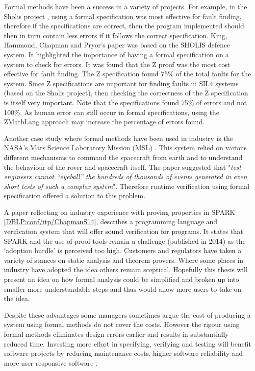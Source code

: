 Formal methods have been a success in a variety of projects. For example, in the Sholis project \cite{sholis}, using a formal specification was most effective for fault finding, therefore if the specifications are correct, then the program implemented should then in turn contain less errors if it follows the correct specification.
King, Hammond, Chapman and Pryor's paper \cite{sholis} was based on the SHOLIS defence system. It highlighted the importance of having a formal specification on a system to check for errors. It was found that the Z proof was the most cost effective for fault finding. The Z specification found 75\% of the total faults for the system. Since Z specifications are important for finding faults in SIL4 systems (based on the Sholis project), then checking the correctness of the Z specification is itself very important. Note that the specifications found 75\% of errors and not 100\%. As human error can still occur in formal specifications, using the ZMathLang approach may increase the percentage of errors found.

Another case study where formal methods have been used in industry is the NASA’s Mars Science Laboratory Mission (MSL) \cite{DBLP:journals/corr/abs-1003-1682}. This system relied on various different mechanisms to command the spacecraft from earth and to understand the behaviour of the rover and spacecraft itself. The paper suggested that "\textit{test engineers cannot “eyeball”
the hundreds of thousands of events generated in even short tests of such a complex system}". Therefore runtime verification using formal specification offered a solution to this problem.

A paper reflecting on industry experience with proving properties in SPARK \ref{DBLP:conf/itp/ChapmanS14}, describes a programming language and verification system that will offer sound verification for programs. It states that SPARK and the use of proof tools remain a challenge (published in 2014) as the `adoption hurdle' is perceived too high. Customers and regulators have taken a variety of stances on static analysis and theorem provers. Where some places in industry have adopted the idea others remain sceptical. Hopefully this thesis will present an idea on how formal analysis could be simplified and broken up into smaller more understandable steps and thus would allow more users to take on the idea.

Despite these advantages some managers sometimes argue the cost of producing a system using formal methods do not cover the costs. However the rigour using formal methods eliminates design errors earlier and results in substantially reduced time. Investing more effort in specifying, verifying and testing will benefit software projects by reducing maintenance costs, higher software reliability and more user-responsive software \cite{chantatub}.

